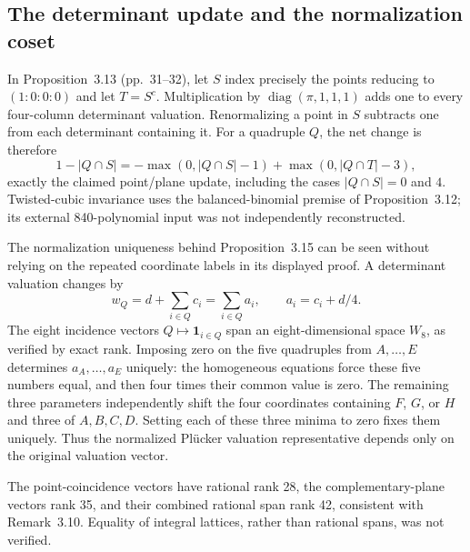 \documentclass[10pt]{article}
\begin{document}
\subsection*{The determinant update and the normalization coset}
In Proposition 3.13 (pp. 31–32), let \(S\) index precisely the points reducing to \((1:0:0:0)\) and let \(T=S^c\). Multiplication by \(\operatorname{diag}(\pi,1,1,1)\) adds one to every four-column determinant valuation. Renormalizing a point in \(S\) subtracts one from each determinant containing it. For a quadruple \(Q\), the net change is therefore \[1-|Q\cap S|
 =-\max(0,|Q\cap S|-1)+\max(0,|Q\cap T|-3),\] exactly the claimed point/plane update, including the cases \(|Q\cap S|=0\) and \(4\). Twisted-cubic invariance uses the balanced-binomial premise of Proposition 3.12; its external 840-polynomial input was not independently reconstructed.\par
The normalization uniqueness behind Proposition 3.15 can be seen without relying on the repeated coordinate labels in its displayed proof. A determinant valuation changes by \[w_Q=d+\sum_{i\in Q}c_i=\sum_{i\in Q}a_i,
 \qquad a_i=c_i+d/4.\] The eight incidence vectors \(Q\mapsto\mathbf1_{i\in Q}\) span an eight-dimensional space \(W_8\), as verified by exact rank. Imposing zero on the five quadruples from \(A,\ldots,E\) determines \(a_A,\ldots,a_E\) uniquely: the homogeneous equations force these five numbers equal, and then four times their common value is zero. The remaining three parameters independently shift the four coordinates containing \(F\), \(G\), or \(H\) and three of \(A,B,C,D\). Setting each of these three minima to zero fixes them uniquely. Thus the normalized Plücker valuation representative depends only on the original valuation vector.\par
The point-coincidence vectors have rational rank 28, the complementary-plane vectors rank 35, and their combined rational span rank 42, consistent with Remark 3.10. Equality of integral lattices, rather than rational spans, was not verified.\par
\end{document}
